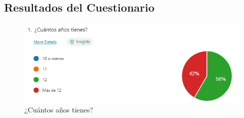 \subsection{Resultados del Cuestionario}
\begin{figure}[H]
  \centering
  \includegraphics[width=450px,clip=true]{questionario_1.png}
  \caption{¿Cuántos años tienes?}
  \label{fig:questionario_1}
\end{figure}
\raggedbottom



